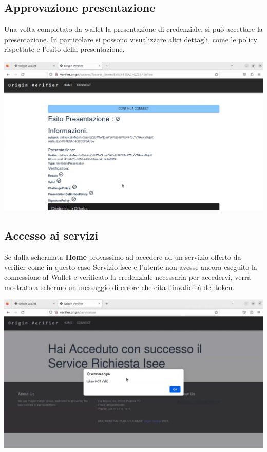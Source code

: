 \subsection{Approvazione presentazione}
Una volta completato da wallet la presentazione di credenziale, si può accettare la presentazione. In particolare si possono visualizzare altri dettagli, come le policy rispettate e l'esito della presentazione.
\begin{center}
    \includegraphics[scale = 0.2]{./res/img/verifier/new/verifier_after_presentation.png}
\end{center}
\subsection{Accesso ai servizi}
Se dalla schermata \textbf{Home} provassimo ad accedere ad un servizio offerto da verifier come in questo caso Servizio isee e l'utente non avesse ancora eseguito la connessione al Wallet e verificato la credenziale necessaria per accedervi, verrà mostrato a schermo un messaggio di errore che cita l'invalidità del token.

\begin{center}
    
    \includegraphics[scale = 0.2]{./res/img/verifier/new/verifier_token_not_valid.png}
\end{center}

